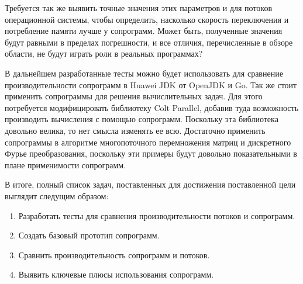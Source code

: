 	Требуется так же выявить точные значения этих параметров и для потоков операционной
	системы, чтобы определить, насколько скорость переключения и потребление памяти лучше
	у сопрограмм. Может быть, полученные значения будут равными в пределах погрешности,
	и все отличия, перечисленные в обзоре области, не будут играть роли в реальных программах?
	\par
	В дальнейшем разработанные тесты можно будет использовать для сравнение производительности сопрограмм в
	Huawei JDK от OpenJDK и Go. Так же стоит применить сопрограммы для решения вычислительных задач.
	Для этого потребуется модифицировать библиотеку Colt Parallel, добавив туда возможность производить
	вычисления с помощью сопрограмм. Поскольку эта библиотека довольно велика, то нет смысла
	изменять ее всю. Достаточно применить сопрограммы в алгоритме многопоточного перемножения
	матриц и дискретного Фурье преобразования, поскольку эти примеры будут довольно показательными в плане
	применимости сопрограмм.
	\par
	В итоге, полный список задач, поставленных для достижения поставленной цели выглядит следущим образом:
	\begin{enumerate}[align=left]
	  	\item Разработать тесты для сравнения производительности потоков и сопрограмм.
	  	\item Создать базовый прототип сопрограмм.
	  	\item Сравнить производительность сопрограмм и потоков.
	  	\item Выявить ключевые плюсы использования сопрограмм.
	\end{enumerate}
\clearpage
